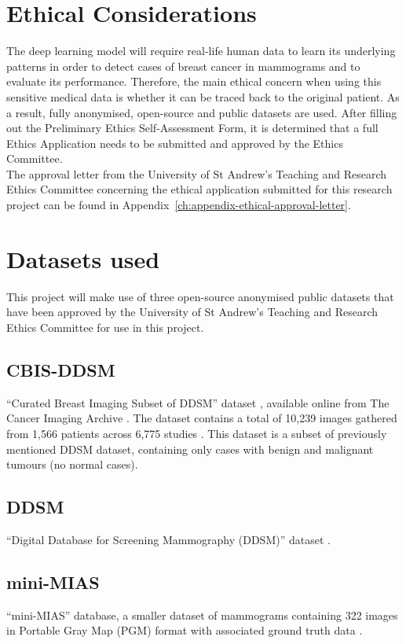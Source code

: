 \section{Ethical Considerations}

The deep learning model will require real-life human data to learn its underlying patterns in order to detect cases of breast cancer in mammograms and to evaluate its performance. Therefore, the main ethical concern when using this sensitive medical data is whether it can be traced back to the original patient. As a result, fully anonymised, open-source and public datasets are used. After filling out the Preliminary Ethics Self-Assessment Form, it is determined that a full Ethics Application needs to be submitted and approved by the Ethics Committee.\\

The approval letter from the University of St Andrew's Teaching and Research Ethics Committee concerning the ethical application submitted for this research project can be found in Appendix~\ref{ch:appendix-ethical-approval-letter}.


\section{Datasets used}

This project will make use of three open-source anonymised public datasets that have been approved by the University of St Andrew's Teaching and Research Ethics Committee for use in this project.

\subsection{CBIS-DDSM}

``Curated Breast Imaging Subset of DDSM'' dataset \cite{Lee2017}, available online from The Cancer Imaging Archive \cite{Clark2013}. The dataset contains a total of 10,239 images gathered from 1,566 patients across 6,775 studies \cite{Lee2017}. This dataset is a subset of previously mentioned DDSM dataset, containing only cases with benign and malignant tumours (no normal cases).

\subsection{DDSM}

``Digital Database for Screening Mammography (DDSM)'' dataset \cite{DDSMdataset2001}.

\subsection{mini-MIAS}

``mini-MIAS'' database, a smaller dataset of mammograms containing 322 images in Portable Gray Map (PGM) format with associated ground truth data \cite{Suckling1994}.